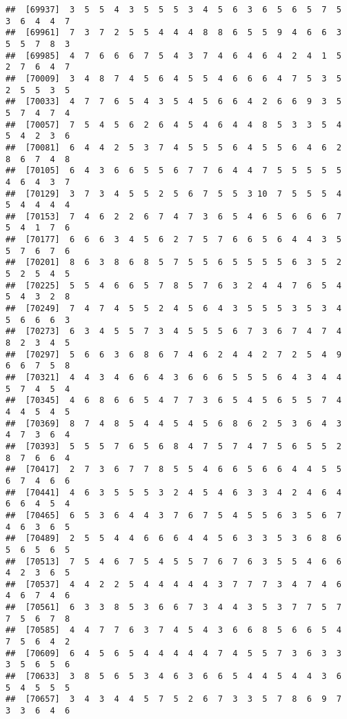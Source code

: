 \documentclass[
]{book}
\begin{document}
\begin{verbatim}
##  [69937]  3  5  5  4  3  5  5  5  3  4  5  6  3  6  5  6  5  7  5  3  6  4  4  7
##  [69961]  7  3  7  2  5  5  4  4  4  8  8  6  5  5  9  4  6  6  3  5  5  7  8  3
##  [69985]  4  7  6  6  6  7  5  4  3  7  4  6  4  6  4  2  4  1  5  2  7  6  4  7
##  [70009]  3  4  8  7  4  5  6  4  5  5  4  6  6  6  4  7  5  3  5  2  5  5  3  5
##  [70033]  4  7  7  6  5  4  3  5  4  5  6  6  4  2  6  6  9  3  5  5  7  4  7  4
##  [70057]  7  5  4  5  6  2  6  4  5  4  6  4  4  8  5  3  3  5  4  5  4  2  3  6
##  [70081]  6  4  4  2  5  3  7  4  5  5  5  6  4  5  5  6  4  6  2  8  6  7  4  8
##  [70105]  6  4  3  6  6  5  5  6  7  7  6  4  4  7  5  5  5  5  5  4  6  4  3  7
##  [70129]  3  7  3  4  5  5  2  5  6  7  5  5  3 10  7  5  5  5  4  5  4  4  4  4
##  [70153]  7  4  6  2  2  6  7  4  7  3  6  5  4  6  5  6  6  6  7  5  4  1  7  6
##  [70177]  6  6  6  3  4  5  6  2  7  5  7  6  6  5  6  4  4  3  5  5  7  6  7  6
##  [70201]  8  6  3  8  6  8  5  7  5  5  6  5  5  5  5  6  3  5  2  5  2  5  4  5
##  [70225]  5  5  4  6  6  5  7  8  5  7  6  3  2  4  4  7  6  5  4  5  4  3  2  8
##  [70249]  7  4  7  4  5  5  2  4  5  6  4  3  5  5  5  3  5  3  4  5  6  6  6  3
##  [70273]  6  3  4  5  5  7  3  4  5  5  5  6  7  3  6  7  4  7  4  8  2  3  4  5
##  [70297]  5  6  6  3  6  8  6  7  4  6  2  4  4  2  7  2  5  4  9  6  6  7  5  8
##  [70321]  4  4  3  4  6  6  4  3  6  6  6  5  5  5  6  4  3  4  4  5  7  4  5  4
##  [70345]  4  6  8  6  6  5  4  7  7  3  6  5  4  5  6  5  5  7  4  4  4  5  4  5
##  [70369]  8  7  4  8  5  4  4  5  4  5  6  8  6  2  5  3  6  4  3  4  7  3  6  4
##  [70393]  5  5  5  7  6  5  6  8  4  7  5  7  4  7  5  6  5  5  2  8  7  6  6  4
##  [70417]  2  7  3  6  7  7  8  5  5  4  6  6  5  6  6  4  4  5  5  6  7  4  6  6
##  [70441]  4  6  3  5  5  5  3  2  4  5  4  6  3  3  4  2  4  6  4  6  6  4  5  4
##  [70465]  6  5  3  6  4  4  3  7  6  7  5  4  5  5  6  3  5  6  7  4  6  3  6  5
##  [70489]  2  5  5  4  4  6  6  6  4  4  5  6  3  3  5  3  6  8  6  5  6  5  6  5
##  [70513]  7  5  4  6  7  5  4  5  5  7  6  7  6  3  5  5  4  6  6  4  2  3  6  5
##  [70537]  4  4  2  2  5  4  4  4  4  4  3  7  7  7  3  4  7  4  6  4  6  7  4  6
##  [70561]  6  3  3  8  5  3  6  6  7  3  4  4  3  5  3  7  7  5  7  7  5  6  7  8
##  [70585]  4  4  7  7  6  3  7  4  5  4  3  6  6  8  5  6  6  5  4  7  5  6  4  2
##  [70609]  6  4  5  6  5  4  4  4  4  4  7  4  5  5  7  3  6  3  3  3  5  6  5  6
##  [70633]  3  8  5  6  5  3  4  6  3  6  6  5  4  4  5  4  4  3  6  5  4  5  5  5
##  [70657]  3  4  3  4  4  5  7  5  2  6  7  3  3  5  7  8  6  9  7  3  3  6  4  6

\end{verbatim}
\end{document}

